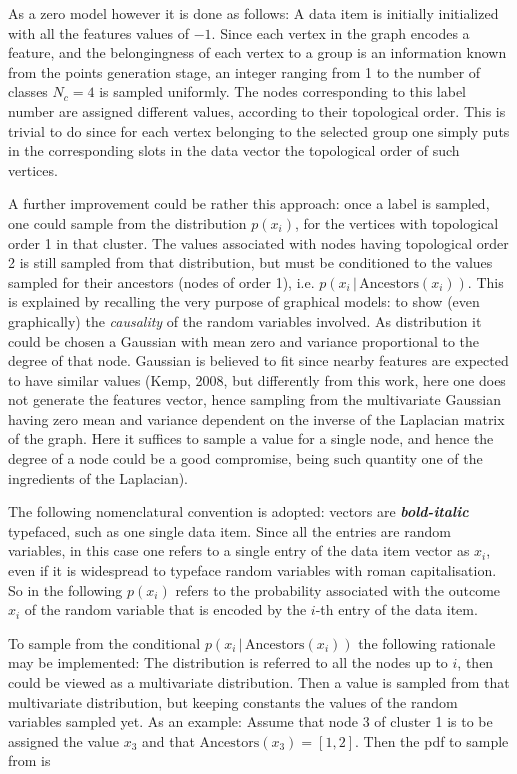 \documentclass[a4paper,12pt]{article}
\begin{document}
As a zero model however it is done as follows: A data item is initially initialized with all the features values of $-1$. Since each vertex in the graph encodes a feature, and the belongingness of each vertex to a group is an information known from the points generation stage, an integer ranging from 1 to the number of classes $N_c = 4$ is sampled uniformly. The nodes corresponding to this label number are assigned different values, according to their topological order. This is trivial to do since for each vertex belonging to the selected group one simply puts in the corresponding slots in the data vector the topological order of such vertices. 

A further improvement could be rather this approach: once a label is sampled, one could sample from the distribution $p(x_i)$, for the vertices with topological order 1 in that cluster. The values associated with nodes having topological order 2 is still sampled from that distribution, but must be conditioned to the values sampled for their ancestors (nodes of order 1), i.e. $p(x_i \, | \, \text{Ancestors}(x_i))$. This is explained by recalling the very purpose of graphical models: to show (even graphically) the \textit{causality} of the random variables involved. As distribution it could be chosen a Gaussian with mean zero and variance proportional to the degree of that node. Gaussian is believed to fit since nearby features are expected to have similar values (Kemp, 2008, but differently from this work, here one does not generate the features vector, hence sampling from the multivariate Gaussian having zero mean and variance dependent on the inverse of the Laplacian matrix of the graph. Here it suffices to sample a value for a single node, and hence the degree of a node could be a good compromise, being such quantity one of the ingredients of the Laplacian).

The following nomenclatural convention is adopted: vectors are \textbf{\textit{bold-italic}} typefaced, such as one single data item. Since all the entries are random variables, in this case one refers to a single entry of the data item vector as $x_i$, even if it is widespread to typeface random variables with roman capitalisation. So in the following $p(x_i)$ refers to the probability associated with the outcome $x_i$ of the random variable that is encoded by the $i$-th entry of the data item.

To sample from the conditional $p(x_i\, | \, \text{Ancestors}(x_i))$ the following rationale may be implemented: The distribution is referred to all the nodes up to $i$, then could be viewed as a multivariate distribution. Then a value is sampled from that multivariate distribution, but keeping constants the values of the random variables sampled yet. As an example: Assume that node 3 of cluster 1 is to be assigned the value $x_3$ and that $\text{Ancestors}(x_3) = [1,2]$. Then the pdf to sample from is 
\end{document}
